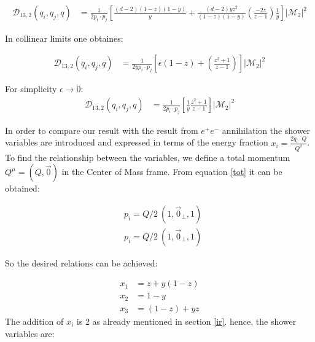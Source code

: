 \begin{equation}
\begin{split}
\mathcal{D}_{13,2} (q_i,q_j,q) &= \frac{1}{2p_i \cdot p_j}[\frac{(d-2)(1-z)(1-y) }{y}+\frac{(d-2)yz^2}{(1-z)(1-y)}(\frac{-2z}{z-1}) \frac{1}{y}]|\mathcal{M}_{2}|^2
\end{split}
\end{equation}

In collinear limits one obtaines:

\begin{equation}
\begin{split}
\mathcal{D}_{13,2} (q_i,q_j,q) &= \frac{1}{2yp_i \cdot p_j}[\epsilon(1-z)+(\frac{z^2+1}{z-1})]|\mathcal{M}_{2}|^2
\end{split}
\end{equation}

For simplicity $ \epsilon \rightarrow 0 $:
\begin{equation}
\begin{split}
\mathcal{D}_{13,2} (q_i,q_j,q) &= \frac{1}{2p_i \cdot p_j}[\frac{1}{y}\frac{z^2+1}{z-1}]|\mathcal{M}_{2}|^2
\end{split}
\end{equation}

In order to compare our result with the result from $ e^+ e^- $ annihilation the shower variables are introduced and expressed in terms of the energy fraction $ x_i=\frac{2 q_i \cdot Q}{Q^2} $.
To find the relationship between the variables, we define a total momentum $Q^{\mu} = (Q, \overrightarrow{0})$ in the Center of Mass frame.
From equation \ref{tot} it can be obtained:

\begin{equation}
\begin{split}
&p_i = Q/2\:(1, \overrightarrow{0}_\bot, 1)\\
&p_i = Q/2\:(1, \overrightarrow{0}_\bot, 1)
\end{split}
\end{equation}

So the desired relations can be achieved:

\begin{equation}
\begin{split}
x_1 &= z + y(1-z)\\
x_2 &= 1-y\\
x_3 &= (1-z)+yz
\label{ret}
\end{split}
\end{equation}
The addition of $x_i$ is 2 as already mentioned in section \ref{ir}.
hence, the shower variables are:

